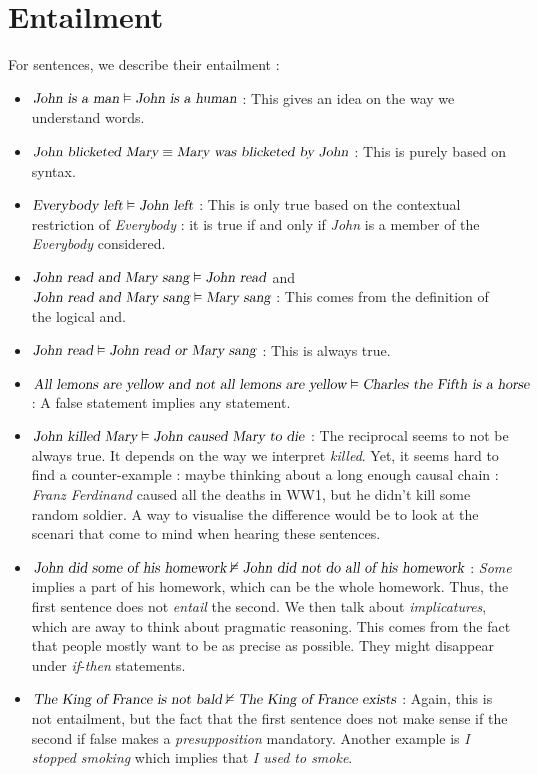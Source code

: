 \documentclass{cours}
\begin{document}
\section{Entailment}
For sentences, we describe their entailment : 
\begin{itemize}
    \item $\textsl{John is a man} \vDash \textsl{John is a human}$ : This gives an idea on the way we understand words.
    \item $\textsl{John blicketed Mary} \equiv \textsl{Mary was blicketed by John}$ : This is purely based on syntax.
    \item $\textsl{Everybody left} \vDash \textsl{John left}$ : This is only true based on the contextual restriction of \textsl{Everybody} : it is true if and only if \textsl{John} is a member of the \textsl{Everybody} considered.
    \item $\textsl{John read and Mary sang} \vDash \textsl{John read}$ and $\textsl{John read and Mary sang} \vDash \textsl{Mary sang}$ : This comes from the definition of the logical and.
    \item $\textsl{John read} \vDash \textsl{John read or Mary sang}$ : This is always true.
    \item $\textsl{All lemons are yellow and not all lemons are yellow} \vDash \textsl{Charles the Fifth is a horse}$ : A false statement implies any statement.
    \item $\textsl{John killed Mary} \vDash \textsl{John caused Mary to die}$ : The reciprocal seems to not be always true. It depends on the way we interpret \textsl{killed}. Yet, it seems hard to find a counter-example : maybe thinking about a long enough causal chain : \textsl{Franz Ferdinand} caused all the deaths in WW1, but he didn't kill some random soldier. A way to visualise the difference would be to look at the scenari that come to mind when hearing these sentences. 
    \item $\textsl{John did some of his homework} \nvDash \textsl{John did not do all of his homework}$ : \textsl{Some} implies a part of his homework, which can be the whole homework. Thus, the first sentence does not \emph{entail} the second. We then talk about \emph{implicatures}, which are away to think about pragmatic reasoning. This comes from the fact that people mostly want to be as precise as possible. They might disappear under \textsl{if}-\textsl{then} statements. 
    \item $\textsl{The King of France is not bald} \nvDash \textsl{The King of France exists}$ : Again, this is not entailment, but the fact that the first sentence does not make sense if the second if false makes a \emph{presupposition} mandatory. Another example is \textsl{I stopped smoking} which implies that \textsl{I used to smoke}.
\end{itemize}
\end{document}
